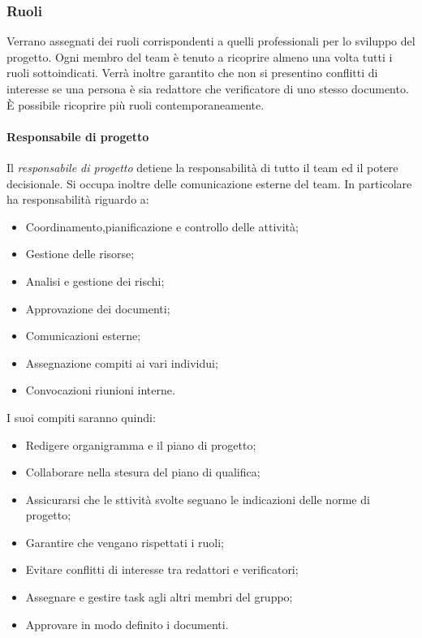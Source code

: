 \subsubsection{Ruoli} \label{sec:ruoli}
	Verrano assegnati dei ruoli corrispondenti a quelli professionali per lo sviluppo del progetto.
	Ogni membro del team è tenuto a ricoprire almeno una volta tutti i ruoli sottoindicati. Verrà inoltre garantito che non si presentino conflitti di interesse se una persona è sia redattore che verificatore di uno stesso documento. È possibile ricoprire più ruoli contemporaneamente.
		\paragraph{Responsabile di progetto}
		Il \textit{responsabile di progetto} detiene la responsabilità di tutto il team ed il potere decisionale. Si occupa inoltre delle comunicazione esterne del team.
		In particolare ha responsabilità riguardo a:
		\begin{itemize}
			\item Coordinamento,pianificazione e controllo delle attività;
			\item Gestione delle risorse;
			\item Analisi e gestione dei rischi;
			\item Approvazione dei documenti;
			\item Comunicazioni esterne;
			\item Assegnazione compiti ai vari individui;
			\item Convocazioni riunioni interne.
		\end{itemize}
		I suoi compiti saranno quindi:
		\begin{itemize}
			\item Redigere organigramma e il piano di progetto;
			\item Collaborare nella stesura del piano di qualifica;
			\item Assicurarsi che le sttività svolte seguano le indicazioni delle norme di progetto;
			\item Garantire che vengano rispettati i ruoli;
			\item Evitare conflitti di interesse tra redattori e verificatori;
			\item Assegnare e gestire task agli altri membri del gruppo;
			\item Approvare in modo definito i documenti.
		\end{itemize}
